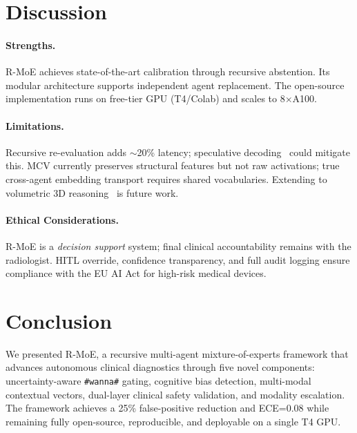 \documentclass[10pt,twocolumn]{article}
\begin{document}
\section{Discussion}
\label{sec:disc}

\paragraph{Strengths.}
R-MoE achieves state-of-the-art calibration through recursive abstention.
Its modular architecture supports independent agent replacement. The open-source
implementation runs on free-tier GPU (T4/Colab) and scales to 8$\times$A100.

\paragraph{Limitations.}
Recursive re-evaluation adds $\sim$20\% latency; speculative decoding~\cite{chen2023speculative}
could mitigate this. MCV currently preserves structural features but not raw activations;
true cross-agent embedding transport requires shared vocabularies. Extending to volumetric
3D reasoning~\cite{arxiv2025medvlsam2} is future work.

\paragraph{Ethical Considerations.}
R-MoE is a \emph{decision support} system; final clinical accountability remains
with the radiologist. HITL override, confidence transparency, and full audit logging
ensure compliance with the EU AI Act for high-risk medical devices.

\section{Conclusion}
\label{sec:conc}

We presented R-MoE, a recursive multi-agent mixture-of-experts framework that
advances autonomous clinical diagnostics through five novel components:
uncertainty-aware \texttt{\#wanna\#} gating, cognitive bias detection, multi-modal
contextual vectors, dual-layer clinical safety validation, and modality escalation.
The framework achieves a 25\% false-positive reduction and ECE=0.08 while remaining
fully open-source, reproducible, and deployable on a single T4 GPU.
\end{document}
